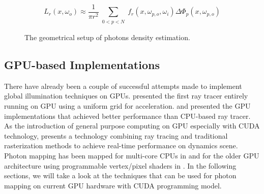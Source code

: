 \begin{equation}
L_r(x, \omega_{o}) \approx \frac{1}{\pi r^{2}}\sum_{\substack{0<p<N}}f_{r}(x, \omega_{p, o}, \omega_{i})\Delta \Phi_{p}(x,\omega_{p, o}) 
\label{eq:photon_estimate}
\end{equation} 

\begin{figure}[ftp] 
    \centering 
    \renewcommand{\thefigure}{\thechapter.\arabic{figure}}
    \caption[Photon Density Estimation Model]{The geometrical setup of photons density estimation.}
    \label{fig:photon_density_estimate} 
\end{figure} 

\subsection{GPU-based Implementations}
There have already been a couple of successful attempts made to implement global illumination techniques on GPUs. \citeauthor{Purcell:2002:RTP:566654.566640}\cite{Purcell:2002:RTP:566654.566640} presented the first ray tracer entirely running on GPU using a uniform grid for acceleration. \cite{Horn:2007:IKT:1230100.1230129} and \cite{Popov2007} presented the GPU implementations that achieved better performance than CPU-based ray tracer. As the introduction of general purpose computing on GPU especially with CUDA technology, \citeauthor{Luebke2008} \cite{Luebke2008} presents a technology combining ray tracing and traditional rasterization methods to achieve real-time performance on dynamics scene. Photon mapping has been mapped for multi-core CPUs in \cite{gunther:realtime} and for the older GPU architecture using programmable vertex/pixel shaders in \cite{Purcell:2005:PMP:1198555.1198797}. In the following sections, we will take a look at the techniques that can
be used for photon mapping on current GPU hardware with CUDA programming model.  


